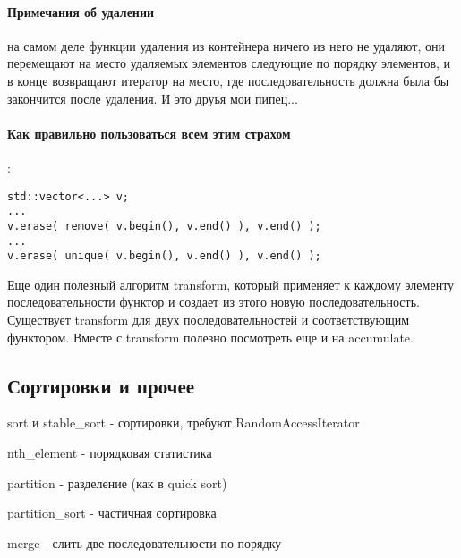 \paragraph{Примечания об удалении} на самом деле функции удаления из контейнера ничего из него не удаляют, они перемещают на место удаляемых элементов следующие
по порядку элементов, и в конце возвращают итератор на место, где последовательность должна была бы закончится после удаления. И это друья мои пипец...

\paragraph{Как правильно пользоваться всем этим страхом}:
\begin{lstlisting}
std::vector<...> v;
...
v.erase( remove( v.begin(), v.end() ), v.end() );
...
v.erase( unique( v.begin(), v.end() ), v.end() );
\end{lstlisting}

Еще один полезный алгоритм transform, который применяет к каждому элементу последовательности функтор и создает из этого новую последовательность.
Существует transform для двух последовательностей и соответствующим функтором. Вместе с transform полезно посмотреть еще и на accumulate.

\subsection{Сортировки и прочее}

sort и stable\_sort - сортировки, требуют RandomAccessIterator

nth\_element - порядковая статистика

partition - разделение (как в quick sort)

partition\_sort - частичная сортировка

merge - слить две последовательности по порядку